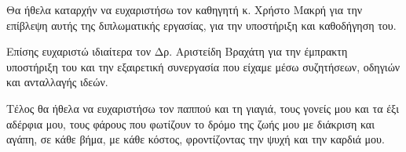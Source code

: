 \begin{acknowledgements}
Θα ήθελα καταρχήν να ευχαριστήσω τον καθηγητή κ. Χρήστο Μακρή
για την επίβλεψη αυτής της διπλωματικής εργασίας, για την υποστήριξη και καθοδήγηση του. 

Επίσης ευχαριστώ ιδιαίτερα τον Δρ. Αριστείδη Βραχάτη για την έμπρακτη υποστήριξη του και την εξαιρετική συνεργασία που είχαμε μέσω συζητήσεων, οδηγιών και ανταλλαγής ιδεών. 

Τέλος θα ήθελα να ευχαριστήσω τον παππού και τη γιαγιά, τους γονείς μου και τα έξι αδέρφια μου, τους φάρους που φωτίζουν το δρόμο της ζωής μου με διάκριση και αγάπη, σε κάθε βήμα, με κάθε κόστος, φροντίζοντας την ψυχή και την καρδιά μου.
\end{acknowledgements}